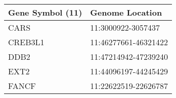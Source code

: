 \begin{tabular}{ll}
\toprule
Gene Symbol (11) &      Genome Location \\
\midrule
            CARS &   11:3000922-3057437 \\
         CREB3L1 & 11:46277661-46321422 \\
            DDB2 & 11:47214942-47239240 \\
            EXT2 & 11:44096197-44245429 \\
           FANCF & 11:22622519-22626787 \\
\bottomrule
\end{tabular}
